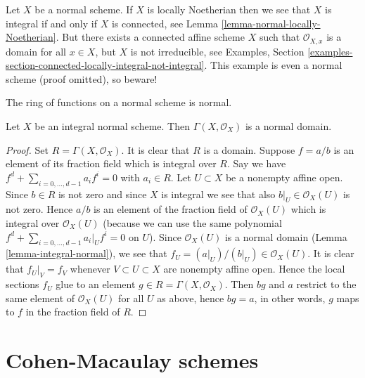 \begin{remark}
\label{remark-normal-connected-irreducible}
Let $X$ be a normal scheme. If $X$ is locally Noetherian then we see that
$X$ is integral if and only if $X$ is connected, see
Lemma \ref{lemma-normal-locally-Noetherian}.
But there exists a connected affine scheme $X$ such that
$\mathcal{O}_{X, x}$ is a domain for all $x \in X$, but $X$ is not
irreducible, see Examples, Section
\ref{examples-section-connected-locally-integral-not-integral}.
This example is even a normal scheme (proof omitted), so beware!
\end{remark}

\begin{lemma}
\label{lemma-normal-integral-sections}
\begin{slogan}
The ring of functions on a normal scheme is normal.
\end{slogan}
Let $X$ be an integral normal scheme.
Then $\Gamma(X, \mathcal{O}_X)$ is a normal domain.
\end{lemma}

\begin{proof}
Set $R = \Gamma(X, \mathcal{O}_X)$.
It is clear that $R$ is a domain.
Suppose $f = a/b$ is an element of its fraction field
which is integral over $R$. Say we have
$f^d + \sum_{i = 0, \ldots, d - 1} a_i f^i = 0$ with
$a_i \in R$. Let $U \subset X$ be a nonempty affine open.
Since $b \in R$ is not zero and since $X$ is integral we see
that also $b|_U \in \mathcal{O}_X(U)$ is not zero.
Hence $a/b$ is an element of the fraction field of
$\mathcal{O}_X(U)$ which is integral over $\mathcal{O}_X(U)$
(because we can use the same polynomial
$f^d + \sum_{i = 0, \ldots, d - 1} a_i|_U f^i = 0$ on $U$).
Since $\mathcal{O}_X(U)$ is a normal domain
(Lemma \ref{lemma-integral-normal}), we see that
$f_U = (a|_U)/(b|_U) \in \mathcal{O}_X(U)$. It is clear
that $f_U|_V = f_V$ whenever $V \subset U \subset X$ are
nonempty affine open. Hence the local sections $f_U$ glue to an element
$g \in R = \Gamma(X, \mathcal{O}_X)$. Then $bg$ and $a$
restrict to the same element of $\mathcal{O}_X(U)$ for
all $U$ as above, hence $bg = a$, in other words, $g$ maps to $f$
in the fraction field of $R$.
\end{proof}










\section{Cohen-Macaulay schemes}
\label{section-Cohen-Macaulay}

